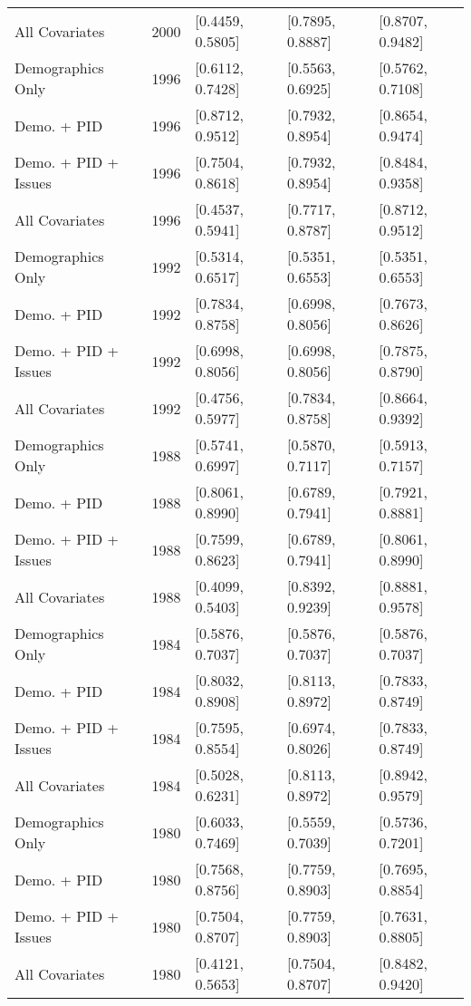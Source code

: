\begin{longtable}{lrlll}
  All Covariates & 2000 & [0.4459, 0.5805] & [0.7895, 0.8887] & [0.8707, 0.9482] \\ 
  Demographics Only & 1996 & [0.6112, 0.7428] & [0.5563, 0.6925] & [0.5762, 0.7108] \\ 
  Demo. + PID & 1996 & [0.8712, 0.9512] & [0.7932, 0.8954] & [0.8654, 0.9474] \\ 
  Demo. + PID + Issues & 1996 & [0.7504, 0.8618] & [0.7932, 0.8954] & [0.8484, 0.9358] \\ 
  All Covariates & 1996 & [0.4537, 0.5941] & [0.7717, 0.8787] & [0.8712, 0.9512] \\ 
  Demographics Only & 1992 & [0.5314, 0.6517] & [0.5351, 0.6553] & [0.5351, 0.6553] \\ 
  Demo. + PID & 1992 & [0.7834, 0.8758] & [0.6998, 0.8056] & [0.7673, 0.8626] \\ 
  Demo. + PID + Issues & 1992 & [0.6998, 0.8056] & [0.6998, 0.8056] & [0.7875, 0.8790] \\ 
  All Covariates & 1992 & [0.4756, 0.5977] & [0.7834, 0.8758] & [0.8664, 0.9392] \\ 
  Demographics Only & 1988 & [0.5741, 0.6997] & [0.5870, 0.7117] & [0.5913, 0.7157] \\ 
  Demo. + PID & 1988 & [0.8061, 0.8990] & [0.6789, 0.7941] & [0.7921, 0.8881] \\ 
  Demo. + PID + Issues & 1988 & [0.7599, 0.8623] & [0.6789, 0.7941] & [0.8061, 0.8990] \\ 
  All Covariates & 1988 & [0.4099, 0.5403] & [0.8392, 0.9239] & [0.8881, 0.9578] \\ 
  Demographics Only & 1984 & [0.5876, 0.7037] & [0.5876, 0.7037] & [0.5876, 0.7037] \\ 
  Demo. + PID & 1984 & [0.8032, 0.8908] & [0.8113, 0.8972] & [0.7833, 0.8749] \\ 
  Demo. + PID + Issues & 1984 & [0.7595, 0.8554] & [0.6974, 0.8026] & [0.7833, 0.8749] \\ 
  All Covariates & 1984 & [0.5028, 0.6231] & [0.8113, 0.8972] & [0.8942, 0.9579] \\ 
  Demographics Only & 1980 & [0.6033, 0.7469] & [0.5559, 0.7039] & [0.5736, 0.7201] \\ 
  Demo. + PID & 1980 & [0.7568, 0.8756] & [0.7759, 0.8903] & [0.7695, 0.8854] \\ 
  Demo. + PID + Issues & 1980 & [0.7504, 0.8707] & [0.7759, 0.8903] & [0.7631, 0.8805] \\ 
  All Covariates & 1980 & [0.4121, 0.5653] & [0.7504, 0.8707] & [0.8482, 0.9420] \\ 

\end{longtable}
